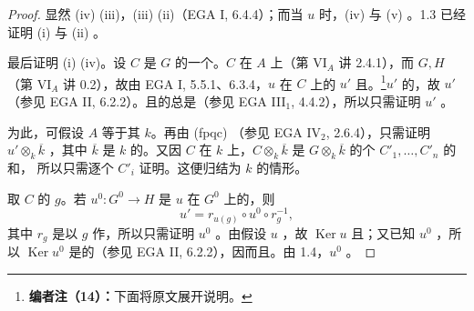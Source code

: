 \begin{proof}
显然 (iv)  (iii)，(iii)  (ii)（EGA I, 6.4.4）；而当 $u$ 时，(iv) 与 (v) 。1.3 已经证明 (i) 与 (ii) 。

最后证明 (i)  (iv)。设 $C$ 是 $G$ 的一个。$C$ 在 $A$ 上（第 VI$_A$ 讲 2.4.1），而 $G,H$ （第 VI$_A$ 讲 0.2），故由 EGA I, 5.5.1、6.3.4，$u$ 在 $C$ 上的 $u'$ 且。\footnote{\textbf{编者注（14）：}下面将原文展开说明。}$u'$ 的，故 $u'$ （参见 EGA II, 6.2.2）。且的总是（参见 EGA III$_1$, 4.4.2），所以只需证明 $u'$ 。

为此，可假设 $A$ 等于其 $k$。再由 (fpqc) （参见 EGA IV$_2$, 2.6.4），只需证明 $u'\otimes_k\overline k$ ，其中 $\overline k$ 是 $k$ 的。又因 $C$ 在 $k$ 上，$C\otimes_k\overline k$ 是 $G\otimes_k\overline k$ 的个 $C'_1,\ldots,C'_n$ 的和，
所以只需逐个 $C'_i$ 证明。这便归结为 $k$ 的情形。

取 $C$ 的 $g$。若 $u^0:G^0\to H$ 是 $u$ 在 $G^0$ 上的，则
\[
u'=r_{u(g)}\circ u^0\circ r_g^{-1},
\]
其中 $r_g$ 是以 $g$ 作，所以只需证明 $u^0$ 。由假设 $u$ ，故 $\operatorname{Ker}u$ 且；又已知 $u^0$ ，所以 $\operatorname{Ker}u^0$ 是的（参见 EGA II, 6.2.2），因而且。由 1.4，$u^0$ 。
\end{proof}
